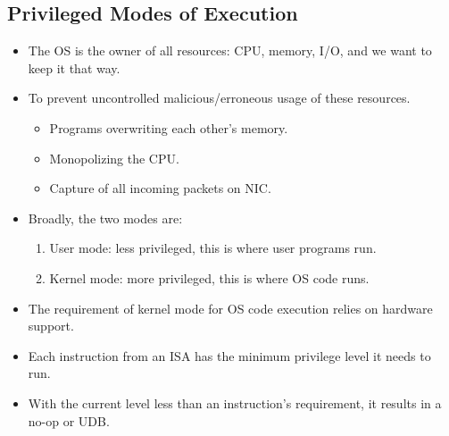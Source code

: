 \documentclass[10pt]{report}
\begin{document}
\subsection{Privileged Modes of Execution}
\begin{itemize}
\item The OS is the owner of all resources: CPU, memory, I/O, and we want to keep it that way.
\item To prevent uncontrolled malicious/erroneous usage of these resources.
\begin{itemize}
    \item Programs overwriting each other's memory.
    \item Monopolizing the CPU.
    \item Capture of all incoming packets on NIC.
\end{itemize}
\item Broadly, the two modes are:
\begin{enumerate}
\item User mode: less privileged, this is where user programs run.
\item Kernel mode: more privileged, this is where OS code runs.
\end{enumerate}
\item The requirement of kernel mode for OS code execution relies on hardware support.
\item Each instruction from an ISA has the minimum privilege level it needs to run.
\item With the current level less than an instruction's requirement, it results in a no-op or UDB.
\end{itemize}
\end{document}
